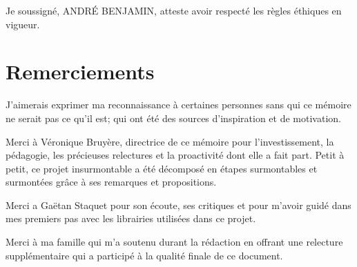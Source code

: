 \vspace*{\fill}
Je soussigné, ANDRÉ BENJAMIN, atteste avoir respecté les règles éthiques en vigueur.
\newpage

\chapter*{Remerciements}

J'aimerais exprimer ma reconnaissance à certaines personnes sans qui ce mémoire ne serait pas ce qu'il est; qui ont été des sources d'inspiration et de motivation.

Merci à Véronique Bruyère, directrice de ce mémoire pour l'investissement, la pédagogie, les précieuses relectures et la proactivité dont elle a fait part. Petit à petit, ce projet insurmontable a été décomposé en étapes surmontables et surmontées grâce à ses remarques et propositions.

Merci a Gaëtan Staquet pour son écoute, ses critiques et pour m'avoir guidé dans mes premiers pas avec les librairies utilisées dans ce projet.

Merci à ma famille qui m'a soutenu durant la rédaction en offrant une relecture supplémentaire qui a participé à la qualité finale de ce document.
